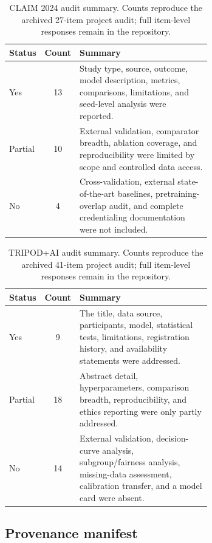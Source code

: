 \documentclass[a4paper,fleqn]{cas-sc}
\begin{document}
\begin{table}[pos=H]
\centering
\caption{CLAIM 2024 audit summary. Counts reproduce the archived 27-item
project audit; full item-level responses remain in the repository.}
\label{tab:s-claim}
\scriptsize
\begin{tabular}{lcp{0.66\linewidth}}
\toprule
Status & Count & Summary \\
\midrule
Yes & 13 & Study type, source, outcome, model description, metrics, comparisons, limitations, and seed-level analysis were reported. \\
Partial & 10 & External validation, comparator breadth, ablation coverage, and reproducibility were limited by scope and controlled data access. \\
No & 4 & Cross-validation, external state-of-the-art baselines, pretraining-overlap audit, and complete credentialing documentation were not included. \\
\bottomrule
\end{tabular}
\end{table}

\begin{table}[pos=H]
\centering
\caption{TRIPOD+AI audit summary. Counts reproduce the archived 41-item project
audit; full item-level responses remain in the repository.}
\label{tab:s-tripod}
\scriptsize
\begin{tabular}{lcp{0.66\linewidth}}
\toprule
Status & Count & Summary \\
\midrule
Yes & 9 & The title, data source, participants, model, statistical tests, limitations, registration history, and availability statements were addressed. \\
Partial & 18 & Abstract detail, hyperparameters, comparison breadth, reproducibility, and ethics reporting were only partly addressed. \\
No & 14 & External validation, decision-curve analysis, subgroup/fairness analysis, missing-data assessment, calibration transfer, and a model card were absent. \\
\bottomrule
\end{tabular}
\end{table}

\subsection{Provenance manifest}
\end{document}
